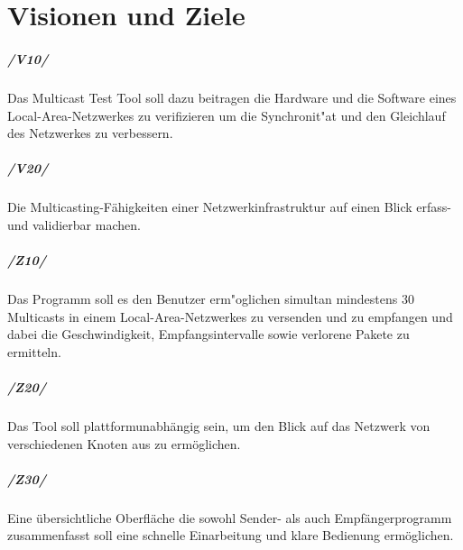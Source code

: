 \chapter{Visionen und Ziele}
\label{cha:visi}


\paragraph{/V10/} Das Multicast Test Tool soll dazu beitragen die Hardware und
die Software eines Local-Area-Netzwerkes zu verifizieren um die Synchronit"at
und den Gleichlauf des Netzwerkes zu verbessern.

\paragraph{/V20/} Die Multicasting-Fähigkeiten einer Netzwerkinfrastruktur auf
einen Blick erfass- und validierbar machen.

\paragraph{/Z10/} Das Programm soll es den Benutzer erm"oglichen simultan
mindestens 30 Multicasts in einem Local-Area-Netzwerkes zu versenden und zu
empfangen und dabei die Geschwindigkeit, Empfangsintervalle sowie verlorene Pakete zu ermitteln.

\paragraph{/Z20/} Das Tool soll plattformunabhängig sein, um den Blick auf das
Netzwerk von verschiedenen Knoten aus zu ermöglichen.

\paragraph{/Z30/} Eine übersichtliche Oberfläche die sowohl Sender- als auch
Empfängerprogramm zusammenfasst soll eine schnelle Einarbeitung und klare
Bedienung ermöglichen.
